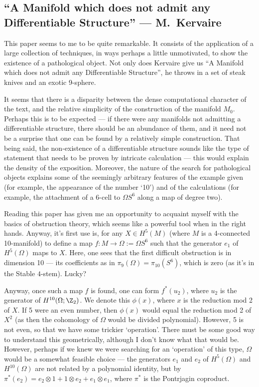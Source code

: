 \documentclass[11pt]{article}
\newcommand{\KanSemResponse}[1]
{
\thispagestyle{fancy}
\subsection*{#1}
}
\begin{document}
\begin{KervaireNoDifferentiableStructure}
\KanSemResponse
{``A Manifold which does not admit any Differentiable Structure'' --- M.\ Kervaire}
This paper seems to me to be quite remarkable. It consists of the application of a large collection of techniques, in ways perhaps a little unmotivated, to show the existence of a pathological object. Not only does Kervaire give us ``A Manifold which does not admit any Differentiable Structure'', he throws in a set of steak knives and an exotic 9-sphere.

It seems that there is a disparity between the dense computational character of the text, and the relative simplicity of the construction of the manifold $M_0$. Perhaps this is to be expected --- if there were any manifolds not admitting a differentiable structure, there should be an abundance of them, and it need not be a surprise that one can be found by a relatively simple construction. That being said, the non-existence of a differentiable structure sounds like the type of statement that needs to be proven by intricate calculation --- this would explain the density of the exposition. Moreover, the nature of the search for pathological objects explains some of the seemingly arbitrary features of the example given (for example, the appearance of the number `10') and of the calculations (for example, the attachment of a 6-cell to $\Omega S^6$ along a map of degree two).

Reading this paper has given me an opportunity to acquaint myself with the basics of obstruction theory, which seems like a powerful tool when in the right hands. Anyway, it's first use is, for any $X\in H^5(M)$ (where $M$ is a 4-connected 10-manifold) to define a map $f:M\to\Omega:=\Omega S^6$ such that the generator $e_1$ of $H^5(\Omega)$ maps to $X$. Here, one sees that the first difficult obstruction is in dimension 10 --- its coefficients as in $\pi_9(\Omega)=\pi_{10}(S^6)$, which is zero (as it's in the Stable $4$-stem). Lucky?

Anyway, once such a map $f$ is found, one can form $f^*(u_2)$, where $u_2$ is the generator of $H^{10}(\Omega;\Z_2)$. We denote this $\phi(x)$, where $x$ is the reduction mod 2 of $X$. If 5 were an even number, then $\phi(x)$ would equal the reduction mod 2 of $X^2$ (as then the cohomology of $\Omega$ would be divided polynomial). However, 5 is not even, so that we have some trickier `operation'. There must be some good way to understand this geometrically, although I don't know what that would be. However, perhaps if we knew we were searching for an `operation' of this type, $\Omega$ would be a somewhat feasible choice --- the generators $e_1$ and $e_2$ of $H^5(\Omega)$ and $H^{10}(\Omega)$ are not related by a polynomial identity, but by $\pi^*(e_2)=e_2\otimes1+1\otimes e_2+e_1\otimes e_1$, where $\pi^*$ is the Pontrjagin coproduct.


\end{KervaireNoDifferentiableStructure}
\end{document}

